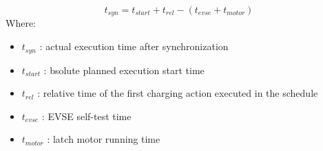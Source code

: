 \documentclass[
english,
ruledheaders=section,%
class=report,%
thesis={type=Report},%
accentcolor=9c,%
custommargins=true,%
marginpar=false,%
parskip=half-,%
fontsize=11pt,%
logofile={img/tuda_logo.pdf}, %
]{tudapub}
\begin{document}
    \begin{equation}
        \label{eq:timeSynchronize}
        t_{syn} = t_{start} + t_{rel} - ( t_{evse} + t_{motor} )
    \end{equation}
    Where:

    \begin{itemize}
        \item $t_{syn}$ : actual execution time after synchronization
        \item $t_{start}$ : bsolute planned execution start time
        \item $t_{rel}$ : relative time of the first charging action executed in the schedule
        \item $t_{evse}$ : EVSE self-test time
        \item $t_{motor}$ : latch motor running time
    \end{itemize}


\end{document}
